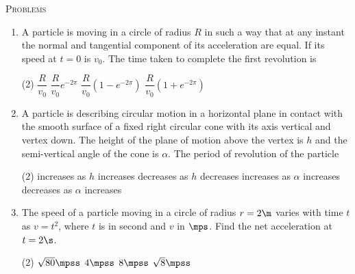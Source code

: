 \documentclass{article}
\renewcommand{\ans}{\quad}
\begin{document}
\begin{center}
    \textsc{Problems}
\end{center}
\begin{enumerate}
    \item A particle is moving in a circle of radius $R$ in such a way that at any instant the normal and tangential component of its acceleration are equal. If its speed at $t = 0$ is $v_0$. The time taken to complete the first revolution is
        \begin{tasks}(2)
            \task $\dfrac{R}{v_0}$
            \task $\dfrac{R}{v_0}e^{-2\pi}$
            \task $\dfrac{R}{v_0}\left(1-e^{-2\pi}\right)$\ans
            \task $\dfrac{R}{v_0}\left(1+e^{-2\pi}\right)$
        \end{tasks}

    \item A particle is describing circular motion in a horizontal plane in contact with the smooth surface of a fixed right circular cone with its axis vertical and vertex down. The height of the plane of motion above the vertex is $h$ and the semi-vertical angle of the cone is $\alpha$. The period of revolution of the particle
    \begin{center}
    \end{center}
    \begin{tasks}(2)
        \task increases as $h$ increases\ans
        \task decreases as $h$ decreases
        \task increases as $\alpha$ increases
        \task decreases as $\alpha$ increases\ans
    \end{tasks}

    \item The speed of a particle moving in a circle of radius $r = 2 \m$ varies with time $t$ as $v = t^2$, where $t$ is in second and $v$ in $\mps$. Find the net acceleration at $t = 2 \s$.
    \begin{tasks}(2)
        \task $\sqrt{80}\mpss$\ans
        \task $4\mpss$
        \task $8\mpss$
        \task $\sqrt{8}\mpss$
    \end{tasks}


\end{enumerate}
\end{document}
